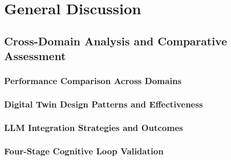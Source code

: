 
\chapter{General Discussion} \label{chp:discussion}


\section{Cross-Domain Analysis and Comparative Assessment}

\subsection{Performance Comparison Across Domains}

\subsection{Digital Twin Design Patterns and Effectiveness}

\subsection{LLM Integration Strategies and Outcomes}

\subsection{Four-Stage Cognitive Loop Validation}

